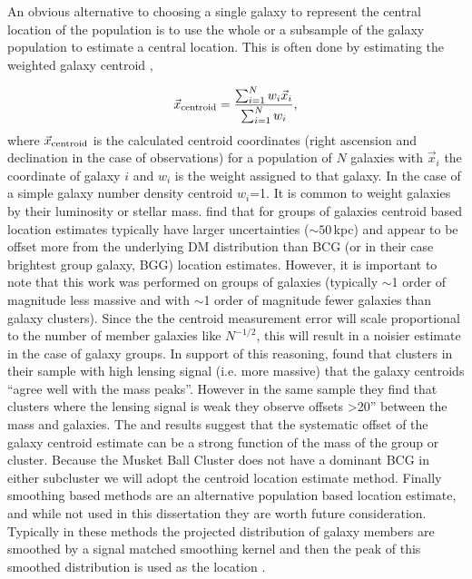 An obvious alternative to choosing a single galaxy to represent the central location of the population is to use the whole or a subsample of the galaxy population to estimate a central location.
This is often done by estimating the weighted galaxy centroid \citep[e.g.][]{Berlind:2006dy, Carlberg:2001fp, Jee:2011we, George:2012uo},

\begin{equation}
\vec{x}_{\rm centroid} = \frac{\sum_{i=1}^N w_i\vec{x}_i}{\sum_{i=1}^N w_i},
\end{equation}\label{equation:WeightedCentroid} 
where $\vec{x}_{\rm centroid}$ is the calculated centroid coordinates (right ascension and declination in the case of observations) for a population of $N$ galaxies with $\vec{x}_i$ the coordinate of galaxy $i$ and $w_i$ is the weight assigned to that galaxy.
In the case of a simple galaxy number density centroid $w_i$=1.
It is common to weight galaxies by their luminosity or stellar mass.
\citet{George:2012uo} find that for groups of galaxies centroid based location estimates typically have larger uncertainties ($\sim50$\,kpc) and appear to be offset more from the underlying DM distribution than BCG (or in their case brightest group galaxy, BGG) location estimates.
However, it is important to note that this work was performed on groups of galaxies (typically $\sim$1 order of magnitude less massive and with $\sim$1 order of magnitude fewer galaxies than galaxy clusters).
Since the the centroid measurement error will scale proportional to the number of member galaxies like $N^{-1/2}$, this will result in a noisier estimate in the case of galaxy groups.
In support of this reasoning, \citet{Jee:2011we} found that clusters in their sample with high lensing signal (i.e. more massive) that the galaxy centroids ``agree well with the mass peaks''.
However in the same sample they find that clusters where the lensing signal is weak they observe offsets >20'' between the mass and galaxies.
The \citet{George:2012uo} and \citet{Jee:2011we} results suggest that the systematic offset of the galaxy centroid estimate can be a strong function of the mass of the group or cluster.
Because the Musket Ball Cluster does not have a dominant BCG in either subcluster we will adopt the centroid location estimate method.
Finally smoothing based methods are an alternative population based location estimate, and while not used in this dissertation they are worth future consideration.
Typically in these methods the projected distribution of galaxy members are smoothed by a signal matched smoothing kernel and then the peak of this smoothed distribution is used as the location \citep[see e.g.][]{Merritt:1994fc, Gonzalez:2002kl, Randall:2008hs}.


